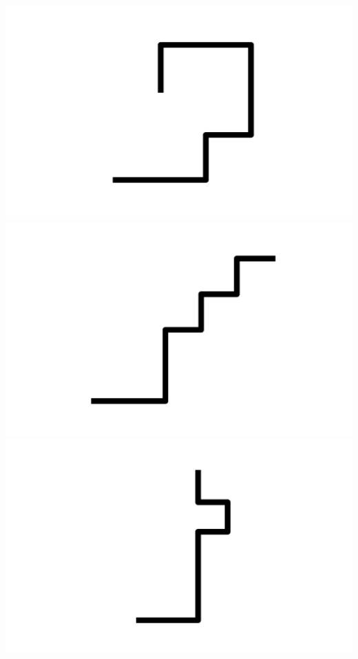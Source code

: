 \documentclass[]{report}
\begin{document}
\includegraphics[scale=.1]{pictures/21/state_cluster_shapes_64.pdf} 
\includegraphics[scale=.1]{pictures/21/state_cluster_shapes_65.pdf} 
\includegraphics[scale=.1]{pictures/21/state_cluster_shapes_66.pdf} 
\end{document}
